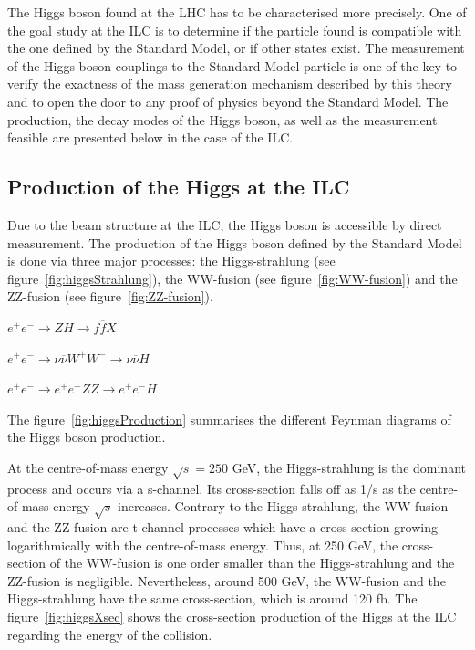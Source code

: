   The Higgs boson found at the \gls{LHC} has to be characterised more precisely.
  One of the goal study at the \gls{ILC} is to determine if the particle found is compatible with the one defined by the Standard Model, or if other states exist.
  The measurement of the Higgs boson couplings to the Standard Model particle is one of the key to verify the exactness of the mass generation mechanism described by this theory and to open the door to any proof of physics beyond the Standard Model.
  The production, the decay modes of the Higgs boson, as well as the measurement feasible are presented below in the case of the \gls{ILC}.


    \subsection{Production of the Higgs at the ILC}

    Due to the beam structure at the \gls{ILC}, the Higgs boson is accessible by direct measurement.
    The production of the Higgs boson defined by the Standard Model is done via three major processes: the Higgs-strahlung (see figure~\ref{fig:higgsStrahlung}), the WW-fusion (see figure~\ref{fig:WW-fusion}) and the ZZ-fusion (see figure~\ref{fig:ZZ-fusion}).

    \begin{description}
      \centering
      \item[Higgs-strahlung:] $e^+e^- \rightarrow ZH \rightarrow f\overline{f}X$
      \item[WW-fusion:] $e^+e^- \rightarrow \nu \overline{\nu} W^+W^- \rightarrow \nu \overline{\nu} H$
      \item[ZZ-fusion:] $e^+e^- \rightarrow e^+e^- ZZ \rightarrow e^+e^- H$
    \end{description}

    The figure~\ref{fig:higgsProduction} summarises the different Feynman diagrams of the Higgs boson production.

    At the centre-of-mass energy $\sqrt{s} = 250$ GeV, the Higgs-strahlung is the dominant process and occurs via a s-channel. 
    Its cross-section falls off as 1/s as the centre-of-mass energy $\sqrt{s}$ increases.
    Contrary to the Higgs-strahlung, the WW-fusion and the ZZ-fusion are t-channel processes which have a cross-section growing logarithmically with the centre-of-mass energy.
    Thus, at 250 GeV, the cross-section of the WW-fusion is one order smaller than the Higgs-strahlung and the ZZ-fusion is negligible.
    Nevertheless, around 500 GeV, the WW-fusion and the Higgs-strahlung have the same cross-section, which is around 120 fb.
    The figure~\ref{fig:higgsXsec} shows the cross-section production of the Higgs at the ILC regarding the energy of the collision.
    
